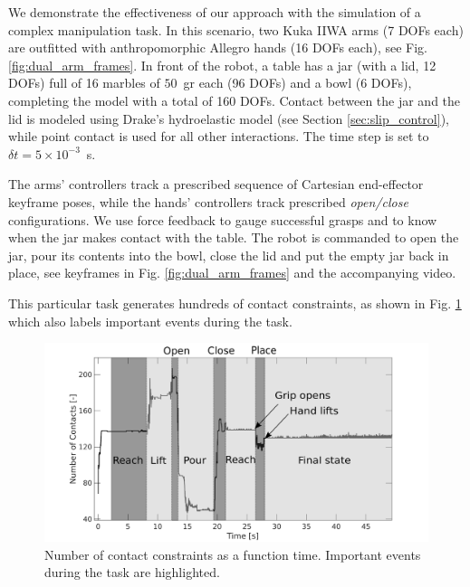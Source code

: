 We demonstrate the effectiveness of our approach with the simulation of a
complex manipulation task. In this scenario, two Kuka IIWA arms (7 DOFs each)
are outfitted with anthropomorphic Allegro hands (16 DOFs each), see Fig.
\ref{fig:dual_arm_frames}. In front of the robot, a table has a jar (with a lid,
12 DOFs) full of 16 marbles of $50$~gr each (96 DOFs) and a bowl (6 DOFs),
completing the model with a total of 160 DOFs. Contact between the jar and the
lid is modeled using Drake's hydroelastic model \cite{bib:elandt2019pressure,
bib:masterjohn2021discrete} (see Section \ref{sec:slip_control}), while point
contact is used for all other interactions. The time step is set to $\delta
t=5\times 10^{-3}$~s.

The arms' controllers track a prescribed sequence of Cartesian end-effector
keyframe poses, while the hands' controllers track prescribed \emph{open/close}
configurations. We use force feedback to gauge successful grasps and to know
when the jar makes contact with the table. The robot is commanded to open the
jar, pour its contents into the bowl, close the lid and put the empty jar back
in place, see keyframes in Fig. \ref{fig:dual_arm_frames} and the accompanying
video. 

This particular task generates hundreds of contact constraints, as shown in Fig.
\ref{fig:dual_arm_contacts} which also labels important events during the task.

\begin{figure}[!h]
	\centering
    \includegraphics[width=0.9\columnwidth]{figures/dual_arm/dual_arm_contact.png}
    \caption{\label{fig:dual_arm_contacts} Number of contact constraints as a
    function time. Important events during the task are highlighted.}
\end{figure}

